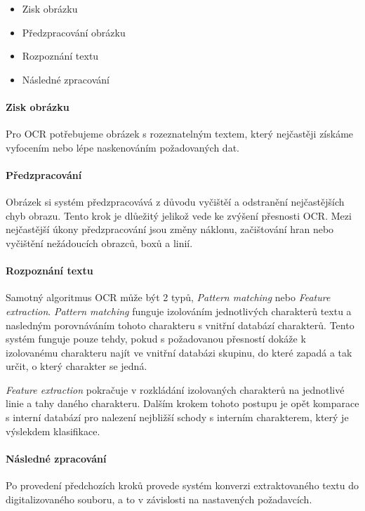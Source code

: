 \documentclass[journal]{IEEEtran}
\begin{document}
\begin{itemize}
 \item Zisk obrázku
 \item Předzpracování obrázku
 \item Rozpoznání textu
 \item Následné zpracování
\end{itemize}

\paragraph{Zisk obrázku}
Pro \ac{OCR} potřebujeme obrázek s rozeznatelným textem, který nejčastěji získáme vyfocením nebo lépe naskenováním požadovaných dat.

\paragraph{Předzpracování}
Obrázek si systém předzpracovává z důvodu vyčištěí a odstranění nejčastějších chyb obrazu.
Tento krok je dlůežitý jelikož vede ke zvýšení přesnosti \ac{OCR}.
Mezi nejčastější úkony předzpracování jsou změny náklonu, začištování hran nebo vyčištění nežádoucích obrazců, boxů a linií.

\paragraph{Rozpoznání textu}
Samotný algoritmus \ac{OCR} může být 2 typů, \textit {Pattern matching} nebo \textit{Feature extraction}.
\textit{Pattern matching} funguje izolováním jednotlivých charakterů textu a nasledným porovnáváním tohoto charakteru s vnitřní databází charakterů. Tento systém funguje pouze tehdy, pokud s požadovanou přesností dokáže k izolovanému charakteru najít ve vnitřní databázi skupinu, do které zapadá a tak určit, o který charakter se jedná.

\textit{Feature extraction} pokračuje v rozkládání izolovaných charakterů na jednotlivé linie a tahy daného charakteru. Dalším krokem tohoto postupu je opět komparace s interní databází pro nalezení nejbližší schody s interním charakterem, který je výslekdem klasifikace.

\paragraph{Následné zpracování}
Po provedení předchozích kroků provede systém konverzi extraktovaného textu do digitalizovaného souboru, a to v závislosti na nastavených požadavcích.
\end{document}
